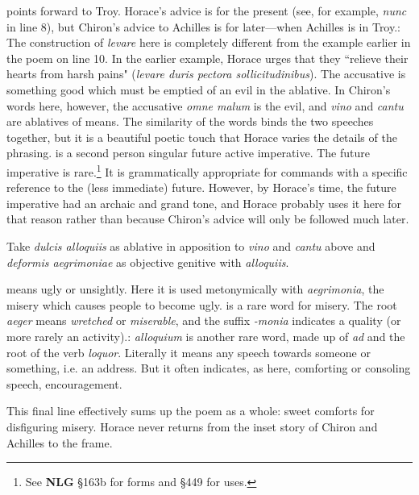 
 points forward to Troy.  Horace's advice is for the present (see, for example, \textit{nunc} in line 8), but Chiron's advice to Achilles is for later---when Achilles is in Troy.\indent{}: The construction of \textit{levare} here is completely different from the example earlier in the poem on line 10.  In the earlier example, Horace urges that they ``relieve their hearts from harsh pains" (\textit{levare duris pectora sollicitudinibus}). The accusative is something good which must be emptied of an evil in the ablative.  In Chiron's words here, however, the accusative \textit{omne malum} is the evil, and \textit{vino} and \textit{cantu} are ablatives of means.  The similarity of the words binds the two speeches together, but it is a beautiful poetic touch that Horace varies the details of the phrasing.\indent{} is a second person singular future active imperative.  The future imperative is rare.\footnote{See \textbf{NLG} \S 163b for forms and \S 449 for uses.}  It is grammatically appropriate for commands with a specific reference to the (less immediate) future.  However, by Horace's time, the future imperative had an archaic and grand tone, and Horace probably uses it here for that reason rather than because Chiron's advice will only be followed much later.


Take \textit{dulcis alloquiis} as ablative in apposition to \textit{vino} and \textit{cantu} above and \textit{deformis aegrimoniae} as objective genitive with \textit{alloquiis}.


 means ugly or unsightly.  Here it is used metonymically with \textit{aegrimonia}, the misery which causes people to become ugly.\indent{} is a rare word for misery.  The root \textit{aeger} means \textit{wretched} or \textit{miserable}, and the suffix \textit{-monia} indicates a quality (or more rarely an activity).\indent{}: \textit{alloquium} is another rare word, made up of \textit{ad} and the root of the verb \textit{loquor}.  Literally it means any speech towards someone or something, i.e. an address.  But it often indicates, as here, comforting or consoling speech, encouragement.

This final line effectively sums up the poem as a whole: sweet comforts for disfiguring misery.  Horace never returns from the inset story of Chiron and Achilles to the frame.

